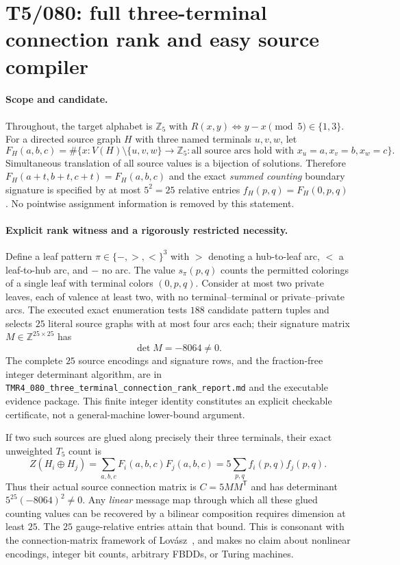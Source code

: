 \documentclass[11pt]{article}
\begin{document}
\section{T5/080: full three-terminal connection rank and easy source compiler}
\label{sec:t5three080}
\paragraph{Scope and candidate.}
Throughout, the target alphabet is $\mathbb{Z}_5$ with
$R(x,y)\iff y-x\pmod{5}\in\{1,3\}$. For a directed source graph $H$
with three named terminals $u,v,w$, let
\[
 F_H(a,b,c)=\#\{x:V(H)\setminus\{u,v,w\}\to\mathbb{Z}_5:
 \text{all source arcs hold with }x_u=a,x_v=b,x_w=c\}.
\]
Simultaneous translation of all source values is a bijection of
solutions. Therefore $F_H(a+t,b+t,c+t)=F_H(a,b,c)$ and the exact
\emph{summed counting} boundary signature is specified by at most
$5^2=25$ relative entries $f_H(p,q)=F_H(0,p,q)$.
No pointwise assignment information is removed by this statement.

\paragraph{Explicit rank witness and a rigorously restricted necessity.}
Define a leaf pattern $\pi\in\{-,>,<\}^3$ with $>$ denoting
a hub-to-leaf arc, $<$ a leaf-to-hub arc, and $-$ no arc.
The value $s_\pi(p,q)$ counts the permitted colorings of a single
leaf with terminal colors $(0,p,q)$. Consider at most two private
leaves, each of valence at least two, with no terminal--terminal or
private--private arcs. The executed exact enumeration tests $188$
candidate pattern tuples and selects $25$ literal source graphs
with at most four arcs each; their signature matrix $M\in
\mathbb{Z}^{25\times25}$ has
\[
             \det M=-8064\ne0.
\]
The complete $25$ source encodings and signature rows, and the
fraction-free integer determinant algorithm, are in
\texttt{TMR4\_080\_three\_terminal\_connection\_rank\_report.md}
and the executable evidence package. This finite integer identity
constitutes an explicit checkable certificate, not a general-machine
lower-bound argument.

If two such sources are glued along precisely their three terminals,
their exact unweighted $T_5$ count is
\[
 Z(H_i\oplus H_j)=\sum_{a,b,c}F_i(a,b,c)F_j(a,b,c)
  =5\sum_{p,q}f_i(p,q)f_j(p,q).
\]
Thus their actual source connection matrix is $C=5MM^{\mathsf T}$
and has determinant $5^{25}(-8064)^2\ne0$.
Any \emph{linear} message map through which all these glued counting
values can be recovered by a bilinear composition requires dimension
at least $25$. The $25$ gauge-relative entries attain that bound.
This is consonant with the connection-matrix framework
of Lov\'asz~\cite{lovaszconnection}, and makes no claim about nonlinear
encodings, integer bit counts, arbitrary FBDDs, or Turing machines.
\end{document}
